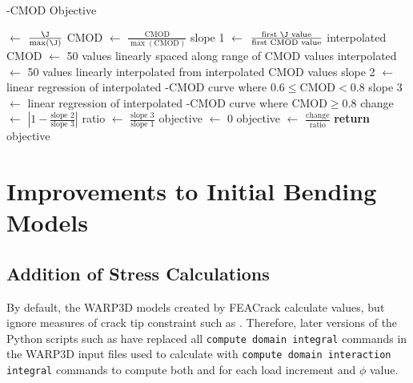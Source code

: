\begin{algorithm}[tbp]
  \caption{\J-CMOD Objective}
  \label{alg:j_cmod_objective}
  \begin{algorithmic}
    \State \J $\gets$ $\frac{\J}{\max(\J)}$ 
    \State CMOD $\gets$ $\frac{\text{CMOD}}{\max(\text{CMOD})}$ 
    \State slope 1 $\gets$ $\frac{\text{first } \J \text{ value}}{\text{first CMOD value}}$ 
    \State interpolated CMOD $\gets$ 50 values linearly spaced along range of CMOD values
    \State {}
    \State interpolated \J $\gets$ 50 values linearly interpolated from interpolated CMOD values
    \State slope 2 $\gets$ linear regression of interpolated \J-CMOD curve where $0.6 \leq \text{CMOD} < 0.8$
    \State slope 3 $\gets$ linear regression of interpolated \J-CMOD curve where $\text{CMOD}\geq 0.8$
    \State change $\gets$ $\left| 1-\frac{\text{slope 2}}{\text{slope 3}} \right|$
    \State ratio $\gets$ $\frac{\text{slope 3}}{\text{slope 1}}$
      \State objective $\gets$ 0
    \Else
      \State objective $\gets$ $\frac{\text{change}}{\text{ratio}}$ 
    \EndIf
    \State \textbf{return} objective
    \EndProcedure
  \end{algorithmic}
\end{algorithm}

\section{Improvements to Initial Bending Models}

\subsection{Addition of \T Stress Calculations}

By default, the WARP3D models created by FEACrack calculate \J values, but ignore measures of crack tip constraint such as \T.
Therefore, later versions of the Python scripts such as  have replaced all \verb|compute domain integral| commands in the WARP3D input files used to calculate \J with \verb|compute domain interaction integral| commands to compute both \J and \T for each load increment and \(\phi\) value.

